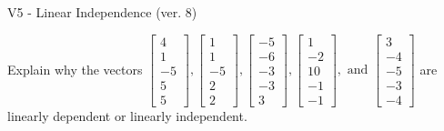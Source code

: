\begin{exercise}
  \begin{exerciseTitle}V5 - Linear Independence (ver. 8)\end{exerciseTitle}
  \begin{exerciseStatement}
    Explain why the vectors \(\left[\begin{array}{r}
4 \\
1 \\
-5 \\
5 \\
5
\end{array}\right] , \left[\begin{array}{r}
1 \\
1 \\
-5 \\
2 \\
2
\end{array}\right] , \left[\begin{array}{r}
-5 \\
-6 \\
-3 \\
-3 \\
3
\end{array}\right] , \left[\begin{array}{r}
1 \\
-2 \\
10 \\
-1 \\
-1
\end{array}\right] , \text{ and } \left[\begin{array}{r}
3 \\
-4 \\
-5 \\
-3 \\
-4
\end{array}\right]\) are linearly dependent or linearly independent.	



\end{exerciseStatement}
\end{exercise}
